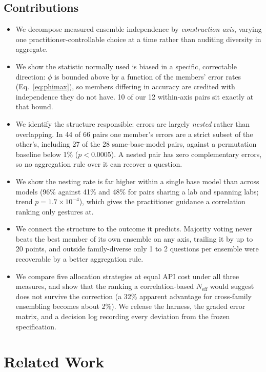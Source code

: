\documentclass[conference]{IEEEtran}
\begin{document}
\subsection{Contributions}
\begin{itemize}
\item We decompose measured ensemble independence by \emph{construction
axis}, varying one practitioner-controllable choice at a time rather than
auditing diversity in aggregate.
\item We show the statistic normally used is biased in a specific,
correctable direction: $\phi$ is bounded above by a function of the members'
error rates (Eq.~\ref{eq:phimax}), so members differing in accuracy are
credited with independence they do not have. 10 of our 12 within-axis pairs
sit exactly at that bound.
\item We identify the structure responsible: errors are largely
\emph{nested} rather than overlapping. In 44 of 66 pairs one member's errors
are a strict subset of the other's, including 27 of the 28 same-base-model
pairs, against a permutation baseline below 1\% ($p<0.0005$). A nested pair
has zero complementary errors, so no aggregation rule over it can recover a
question.
\item We show the nesting rate is far higher within a single base model than
across models (96\% against 41\% and 48\% for pairs sharing a lab and spanning
labs; trend $p=1.7\times10^{-4}$), which gives the practitioner guidance a
correlation ranking only gestures at.
\item We connect the structure to the outcome it predicts. Majority voting
never beats the best member of its own ensemble on any axis, trailing it by
up to 20 points, and outside family-diverse only 1 to 2 questions per
ensemble were recoverable by a better aggregation rule.
\item We compare five allocation strategies at equal API cost under all three
measures, and show that the ranking a correlation-based $N_\text{eff}$ would
suggest does not survive the correction (a 32\% apparent advantage for
cross-family ensembling becomes about 2\%). We release the harness, the graded
error matrix, and a decision log recording every deviation from the frozen
specification.
\end{itemize}

\section{Related Work}
\end{document}
